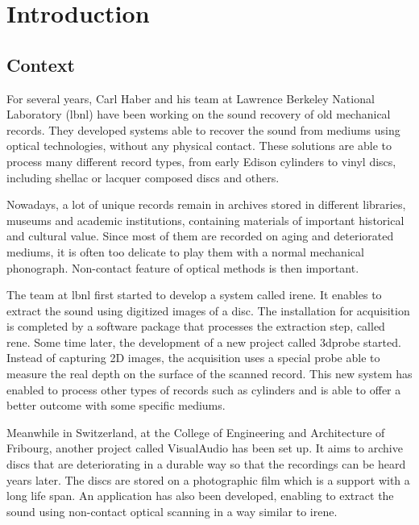 %

\newcommand{\Csh}{C$^\sharp$}


\chapter{Introduction}

\section{Context}

For several years, Carl Haber and his team at Lawrence Berkeley National Laboratory (\gls{lbnl}) have been working on the sound recovery of old mechanical records. They developed systems able to recover the sound from mediums using optical technologies, without any physical contact. These solutions are able to process many different record types, from early Edison cylinders to vinyl discs, including shellac or lacquer composed discs and others.

Nowadays, a lot of unique records remain in archives stored in different libraries, museums and academic institutions, containing materials of important historical and cultural value. Since most of them are recorded on aging and deteriorated mediums, it is often too delicate to play them with a normal mechanical phonograph. Non-contact feature of optical methods is then important.

The team at \gls{lbnl} first started to develop a system called \gls{irene}. It enables to extract the sound using digitized images of a disc. The installation for acquisition is completed by a software package that processes the extraction step, called \gls{rene}. Some time later, the development of a new project called \gls{3dprobe} started. Instead of capturing 2D images, the acquisition uses a special probe able to measure the real depth on the surface of the scanned record. This new system has enabled to process other types of records such as cylinders and is able to offer a better outcome with some specific mediums.

Meanwhile in Switzerland, at the College of Engineering and Architecture of Fribourg, another project called VisualAudio has been set up. It aims to archive discs that are deteriorating in a durable way so that the recordings can be heard years later. The discs are stored on a photographic film which is a support with a long life span. An application has also been developed, enabling to extract the sound using non-contact optical scanning in a way similar to \gls{irene}.

